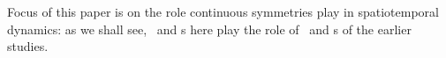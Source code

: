 Focus of this paper is on the role continuous symmetries
play in spatiotemporal dynamics: as we shall see, 
\reqva\ and \rpo s here play the role of \eqva\ and
\po s of the earlier studies.



